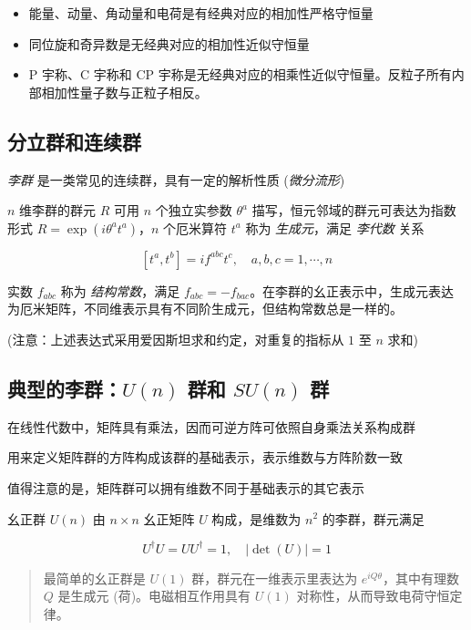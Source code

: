 \documentclass[oneside,a4paper,openany,11pt]{ctexbook}
\begin{document}
\begin{itemize}
    \item 能量、动量、角动量和电荷是有经典对应的相加性严格守恒量
    \item 同位旋和奇异数是无经典对应的相加性近似守恒量
    \item P 宇称、C 宇称和 CP 宇称是无经典对应的相乘性近似守恒量。反粒子所有内部相加性量子数与正粒子相反。
\end{itemize}

\subsection{分立群和连续群}

\emph{李群} 是一类常见的连续群，具有一定的解析性质 (\emph{微分流形})

$n$ 维李群的群元 $R$ 可用 $n$ 个独立实参数 $\theta^a$ 描写，恒元邻域的群元可表达为指数形式 $R=\exp(i\theta^a t^a)$，$n$ 个厄米算符 $t^a$ 称为 \emph{生成元}，满足 \emph{李代数} 关系

\begin{equation}
    \left[t^a, t^b\right] = i f^{abc} t^c, \quad a,b,c = 1, \cdots, n
\end{equation}

实数 $f_{abc}$ 称为 \emph{结构常数}，满足 $f_{abc}=-f_{bac}$。在李群的幺正表示中，生成元表达为厄米矩阵，不同维表示具有不同阶生成元，但结构常数总是一样的。

(注意：上述表达式采用爱因斯坦求和约定，对重复的指标从 $1$ 至 $n$ 求和)

\subsection{典型的李群：$U(n)$ 群和 $SU(n)$ 群}

在线性代数中，矩阵具有乘法，因而可逆方阵可依照自身乘法关系构成群

用来定义矩阵群的方阵构成该群的基础表示，表示维数与方阵阶数一致

值得注意的是，矩阵群可以拥有维数不同于基础表示的其它表示

幺正群 $U(n)$ 由 $n\times n$ 幺正矩阵 $U$ 构成，是维数为 $n^2$ 的李群，群元满足

\begin{equation}
    U^\dagger U = U U^\dagger = 1, \quad |\det(U)|=1
\end{equation}

\begin{quote}
    最简单的幺正群是 $U(1)$ 群，群元在一维表示里表达为 $e^{iQ\theta}$，其中有理数 $Q$ 是生成元 (荷)。电磁相互作用具有 $U(1)$ 对称性，从而导致电荷守恒定律。
\end{quote}
\end{document}
